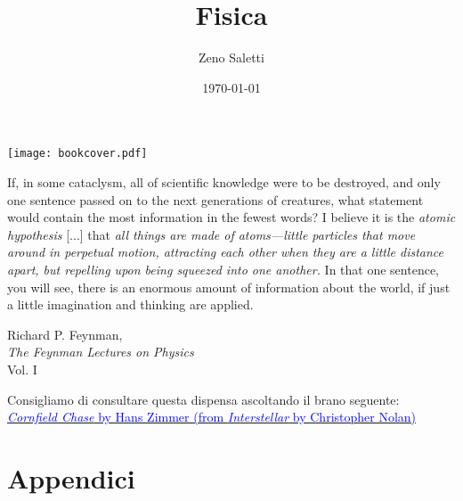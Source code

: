 \documentclass{book}
\title{Fisica}
\author{Zeno Saletti}
\date{\today}
\begin{document}
\begin{titlepage}
    \pagecolor{brown}\afterpage{\nopagecolor}
    \texttt{[image: bookcover.pdf]} %

    \restoregeometry
\end{titlepage}

\epigraph{If, in some cataclysm, all of scientific knowledge were
to be destroyed, and only one sentence passed on to the next generations
of creatures, what statement would contain the most information in the
fewest words? I believe it is the \textit{atomic hypothesis} [...]
that \textit{all things are made of atoms—little particles that move
around in perpetual motion, attracting each other when they are a little
distance apart, but repelling upon being squeezed into one another.}
In that one sentence, you will see, there is an enormous amount of
information about the world, if just a little imagination and
thinking are applied.}{Richard P. Feynman,\\\textit{The Feynman Lectures on Physics}\\Vol. I}

\vspace*{9cm}
\begin{center}
Consigliamo di consultare questa dispensa ascoltando il brano seguente:\\
\href{https://www.youtube.com/watch?v=JuSsvM8B4Jc}{\textcolor{blue}{\textit{Cornfield Chase} by Hans Zimmer (from \textit{Interstellar} by Christopher Nolan)}}
\end{center}



\newpage


\newpage





\dominitoc %
\tableofcontents











\part*{Appendici}
\appendix
\renewcommand{\thechapter}{\Alph{chapter}}




\end{document}
